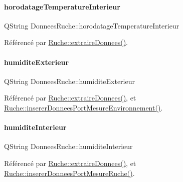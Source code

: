 \mbox{\label{struct_donnees_ruche_a004c7a2447bbcdd2ba212ba2f9866dcd}} 
\paragraph{\texorpdfstring{horodatage\+Temperature\+Interieur}{horodatageTemperatureInterieur}}
{\footnotesize\ttfamily Q\+String Donnees\+Ruche\+::horodatage\+Temperature\+Interieur}



Référencé par \hyperlink{class_ruche_a21c0dafeaec03d451590037343e6a3ca}{Ruche\+::extraire\+Donnees()}.

\mbox{\label{struct_donnees_ruche_ad97156720e4e08cd7aa545cdb8f3822f}} 
\paragraph{\texorpdfstring{humidite\+Exterieur}{humiditeExterieur}}
{\footnotesize\ttfamily Q\+String Donnees\+Ruche\+::humidite\+Exterieur}



Référencé par \hyperlink{class_ruche_a21c0dafeaec03d451590037343e6a3ca}{Ruche\+::extraire\+Donnees()}, et \hyperlink{class_ruche_a46c0f440f40a5125f2d579b481660457}{Ruche\+::inserer\+Donnees\+Port\+Mesure\+Environnement()}.

\mbox{\label{struct_donnees_ruche_a2541ee93816a11da7367b36d4bedc77b}} 
\paragraph{\texorpdfstring{humidite\+Interieur}{humiditeInterieur}}
{\footnotesize\ttfamily Q\+String Donnees\+Ruche\+::humidite\+Interieur}



Référencé par \hyperlink{class_ruche_a21c0dafeaec03d451590037343e6a3ca}{Ruche\+::extraire\+Donnees()}, et \hyperlink{class_ruche_aa61f6dd8b15e5242ef3a3bdd87cca4a3}{Ruche\+::inserer\+Donnees\+Port\+Mesure\+Ruche()}.

